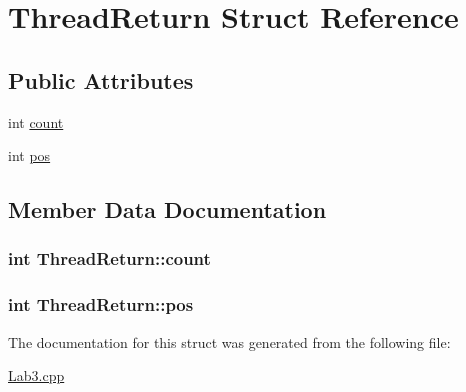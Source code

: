 \hypertarget{structThreadReturn}{}\section{Thread\+Return Struct Reference}
\label{structThreadReturn}
\subsection*{Public Attributes}
\begin{DoxyCompactItemize}
\item 
int \hyperlink{structThreadReturn_ada06b95a1d8c2688d8f7ff617ca82074}{count}
\item 
int \hyperlink{structThreadReturn_acee40ef3ef81baf05c35b71761d7ffad}{pos}
\end{DoxyCompactItemize}


\subsection{Member Data Documentation}
\subsubsection[{\texorpdfstring{count}{count}}]{\setlength{\rightskip}{0pt plus 5cm}int Thread\+Return\+::count}\hypertarget{structThreadReturn_ada06b95a1d8c2688d8f7ff617ca82074}{}\label{structThreadReturn_ada06b95a1d8c2688d8f7ff617ca82074}
\subsubsection[{\texorpdfstring{pos}{pos}}]{\setlength{\rightskip}{0pt plus 5cm}int Thread\+Return\+::pos}\hypertarget{structThreadReturn_acee40ef3ef81baf05c35b71761d7ffad}{}\label{structThreadReturn_acee40ef3ef81baf05c35b71761d7ffad}


The documentation for this struct was generated from the following file\+:\begin{DoxyCompactItemize}
\item 
\hyperlink{Lab3_8cpp}{Lab3.\+cpp}\end{DoxyCompactItemize}
